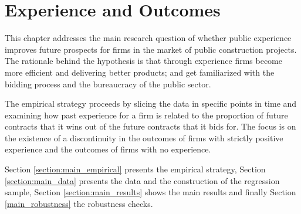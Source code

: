 \chapter{Experience and Outcomes
}
This chapter addresses the main research question of whether public experience improves future prospects for firms in the market of public construction projects.  The rationale behind the hypothesis is that through experience firms become more efficient and delivering better products; and get familiarized with the bidding process and the bureaucracy of the public sector.

The empirical strategy proceeds by slicing the data in specific points in time and examining how past experience for a firm is related to the proportion of future contracts that it wins out of the future contracts that it bids for. The focus is on the existence of a discontinuity in the outcomes of firms with strictly positive experience and the outcomes of firms with no experience.

Section \ref{section:main_empirical} presents the empirical strategy, Section \ref{section:main_data} presents the data and the construction of the regression sample, Section \ref{section:main_results} shows the main results and finally Section \ref{main_robustness} the robustness checks.




